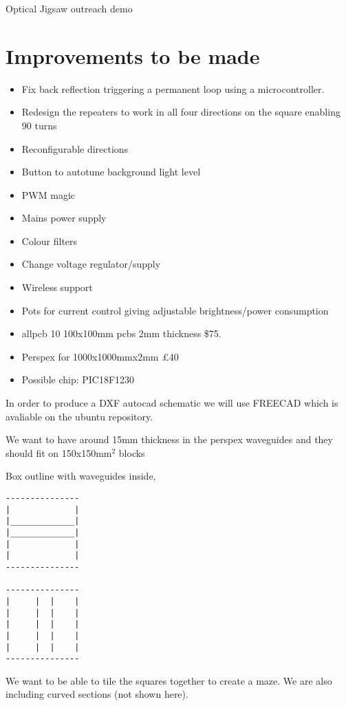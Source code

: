 \documentclass[12pt]{article}
\begin{document}
Optical Jigsaw outreach demo

\section{Improvements to be made}

\begin{itemize}
	\item Fix back reflection triggering a permanent loop using a microcontroller.
	\item Redesign the repeaters to work in all four directions on the square enabling 90 \degree turns 
	\item Reconfigurable directions
	\item Button to autotune background light level
	\item PWM magic
	\item Mains power supply 
	\item Colour filters
	\item Change voltage regulator/supply
	\item Wireless support
	\item Pots for current control giving adjustable brightness/power consumption	
\end{itemize}

\begin{itemize}
	\item allpcb 10 100x100mm pcbs 2mm thickness \$75.
	\item Perspex for 1000x1000mmx2mm £40
        \item Possible chip: PIC18F1230
\end{itemize}

In order to produce a DXF autocad schematic we will use FREECAD which is avaliable on the ubuntu repository.

We want to have around 15mm thickness in the perspex waveguides and they should fit on 150x150mm$^2$ blocks

Box outline with waveguides inside, 
\begin{verbatim}
---------------
|             |
|_____________|
|_____________| 
|             |
|             |
---------------

---------------
|     |  |    |
|     |  |    |
|     |  |    | 
|     |  |    |
|     |  |    |
---------------

\end{verbatim}


We want to be able to tile the squares together to create a maze. We are also including curved sections (not shown here).
\end{document}
